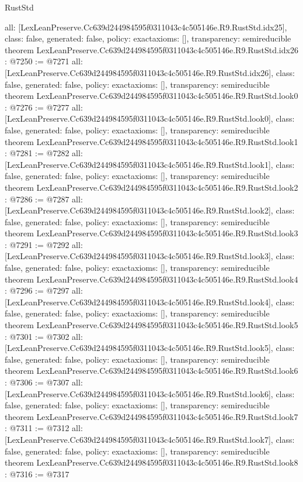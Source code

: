 \begin{lexlean}{RustStd}
\begin{coremodule}
{  all: [LexLeanPreserve.Cc639d244984595f0311043c4c505146e.R9.RustStd.idx25],
  class: false,
  generated: false,
  policy: exact{axioms: []},
  transparency: semireducible
}
theorem LexLeanPreserve.Cc639d244984595f0311043c4c505146e.R9.RustStd.idx26 : @7250 := @7271 {
  all: [LexLeanPreserve.Cc639d244984595f0311043c4c505146e.R9.RustStd.idx26],
  class: false,
  generated: false,
  policy: exact{axioms: []},
  transparency: semireducible
}
theorem LexLeanPreserve.Cc639d244984595f0311043c4c505146e.R9.RustStd.look0 : @7276 := @7277 {
  all: [LexLeanPreserve.Cc639d244984595f0311043c4c505146e.R9.RustStd.look0],
  class: false,
  generated: false,
  policy: exact{axioms: []},
  transparency: semireducible
}
theorem LexLeanPreserve.Cc639d244984595f0311043c4c505146e.R9.RustStd.look1 : @7281 := @7282 {
  all: [LexLeanPreserve.Cc639d244984595f0311043c4c505146e.R9.RustStd.look1],
  class: false,
  generated: false,
  policy: exact{axioms: []},
  transparency: semireducible
}
theorem LexLeanPreserve.Cc639d244984595f0311043c4c505146e.R9.RustStd.look2 : @7286 := @7287 {
  all: [LexLeanPreserve.Cc639d244984595f0311043c4c505146e.R9.RustStd.look2],
  class: false,
  generated: false,
  policy: exact{axioms: []},
  transparency: semireducible
}
theorem LexLeanPreserve.Cc639d244984595f0311043c4c505146e.R9.RustStd.look3 : @7291 := @7292 {
  all: [LexLeanPreserve.Cc639d244984595f0311043c4c505146e.R9.RustStd.look3],
  class: false,
  generated: false,
  policy: exact{axioms: []},
  transparency: semireducible
}
theorem LexLeanPreserve.Cc639d244984595f0311043c4c505146e.R9.RustStd.look4 : @7296 := @7297 {
  all: [LexLeanPreserve.Cc639d244984595f0311043c4c505146e.R9.RustStd.look4],
  class: false,
  generated: false,
  policy: exact{axioms: []},
  transparency: semireducible
}
theorem LexLeanPreserve.Cc639d244984595f0311043c4c505146e.R9.RustStd.look5 : @7301 := @7302 {
  all: [LexLeanPreserve.Cc639d244984595f0311043c4c505146e.R9.RustStd.look5],
  class: false,
  generated: false,
  policy: exact{axioms: []},
  transparency: semireducible
}
theorem LexLeanPreserve.Cc639d244984595f0311043c4c505146e.R9.RustStd.look6 : @7306 := @7307 {
  all: [LexLeanPreserve.Cc639d244984595f0311043c4c505146e.R9.RustStd.look6],
  class: false,
  generated: false,
  policy: exact{axioms: []},
  transparency: semireducible
}
theorem LexLeanPreserve.Cc639d244984595f0311043c4c505146e.R9.RustStd.look7 : @7311 := @7312 {
  all: [LexLeanPreserve.Cc639d244984595f0311043c4c505146e.R9.RustStd.look7],
  class: false,
  generated: false,
  policy: exact{axioms: []},
  transparency: semireducible
}
theorem LexLeanPreserve.Cc639d244984595f0311043c4c505146e.R9.RustStd.look8 : @7316 := @7317 {
}
\end{coremodule}
\end{lexlean}
